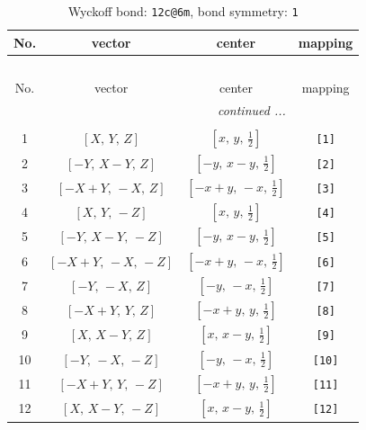 \documentclass[fleqn,8pt]{jsarticle}
\begin{document}
\begin{longtable}{cccc}
\caption{Wyckoff bond: {\tt 12c@6m}, bond symmetry: {\tt 1}}
 \\
 \hline \hline
No. & vector & center & mapping \\ \hline \endfirsthead

\multicolumn{3}{l}{\tablename\ \thetable{}} \\
 \hline \hline
No. & vector & center & mapping \\ \hline \endhead

 \hline \hline
\multicolumn{3}{r}{\footnotesize\it continued ...} \\ \endfoot

 \hline \hline
\multicolumn{3}{r}{} \\ \endlastfoot

1 & $\left[ X,\, Y,\, Z \right]$ & $\left[ x,\, y,\, \frac{1}{2} \right]$ & {\tt [1]} \\ \hline
2 & $\left[ - Y,\, X - Y,\, Z \right]$ & $\left[ - y,\, x - y,\, \frac{1}{2} \right]$ & {\tt [2]} \\ \hline
3 & $\left[ - X + Y,\, - X,\, Z \right]$ & $\left[ - x + y,\, - x,\, \frac{1}{2} \right]$ & {\tt [3]} \\ \hline
4 & $\left[ X,\, Y,\, - Z \right]$ & $\left[ x,\, y,\, \frac{1}{2} \right]$ & {\tt [4]} \\ \hline
5 & $\left[ - Y,\, X - Y,\, - Z \right]$ & $\left[ - y,\, x - y,\, \frac{1}{2} \right]$ & {\tt [5]} \\ \hline
6 & $\left[ - X + Y,\, - X,\, - Z \right]$ & $\left[ - x + y,\, - x,\, \frac{1}{2} \right]$ & {\tt [6]} \\ \hline
7 & $\left[ - Y,\, - X,\, Z \right]$ & $\left[ - y,\, - x,\, \frac{1}{2} \right]$ & {\tt [7]} \\ \hline
8 & $\left[ - X + Y,\, Y,\, Z \right]$ & $\left[ - x + y,\, y,\, \frac{1}{2} \right]$ & {\tt [8]} \\ \hline
9 & $\left[ X,\, X - Y,\, Z \right]$ & $\left[ x,\, x - y,\, \frac{1}{2} \right]$ & {\tt [9]} \\ \hline
10 & $\left[ - Y,\, - X,\, - Z \right]$ & $\left[ - y,\, - x,\, \frac{1}{2} \right]$ & {\tt [10]} \\ \hline
11 & $\left[ - X + Y,\, Y,\, - Z \right]$ & $\left[ - x + y,\, y,\, \frac{1}{2} \right]$ & {\tt [11]} \\ \hline
12 & $\left[ X,\, X - Y,\, - Z \right]$ & $\left[ x,\, x - y,\, \frac{1}{2} \right]$ & {\tt [12]} \\
\end{longtable}
\end{document}
